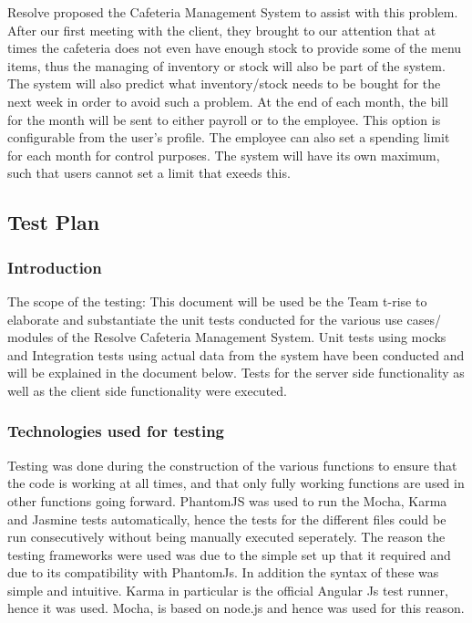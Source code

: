\documentclass[a4paper,12pt]{article}
\begin{document}
Resolve proposed the Cafeteria Management System to assist with this problem.
After our first meeting with the client, they brought to our attention that at times the cafeteria does not even have enough stock to provide some of the menu items, thus the managing of inventory or stock will also be part of the system. The system will also predict what inventory/stock needs to be bought for the next week in order to avoid such a problem. At the end of each month, the bill for the month will be sent to either payroll or to the employee. This option is configurable from the user's profile. The employee can also set a spending limit for each month for control purposes. The system will have its own maximum, such that users cannot set a limit that exeeds this. 


\subsection{Test Plan}

\subsubsection{Introduction}
The scope of the testing: This document will be used be the Team t-rise to elaborate and substantiate the unit tests conducted for the various use cases/ modules of the Resolve Cafeteria Management System. Unit tests using mocks and Integration tests using actual data from the system have been conducted and will be explained in the document below. Tests for the server side functionality as well as the client side functionality were executed.

\subsubsection{Technologies used for testing}
Testing was done during the construction of the various functions to ensure that the code is working at all times, and that only fully working functions are used in other functions going forward. PhantomJS was used to run the Mocha, Karma and Jasmine tests automatically, hence the tests for the different files could be run consecutively without being manually executed seperately. The reason the testing frameworks were used was due to the simple set up that it required and due to its compatibility with PhantomJs. In addition the syntax of these was simple and intuitive.  Karma in particular is the official Angular Js test runner, hence it was used. Mocha, is based on node.js and hence was used for this reason. 
\\
\end{document}
